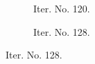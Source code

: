 \documentclass[a4paper,12pt]{amsart}
\numberwithin{equation}{section}
\begin{document}
\begin{figure}[h!]
\centering
\begin{subfigure}[t]{0.49\textwidth}
    \caption{Iter. No. 120.}
\end{subfigure}
	\hfill
\begin{subfigure}[t]{0.49\textwidth}
    \caption{Iter. No. 128.}
\end{subfigure}


\end{figure}
\end{document}
